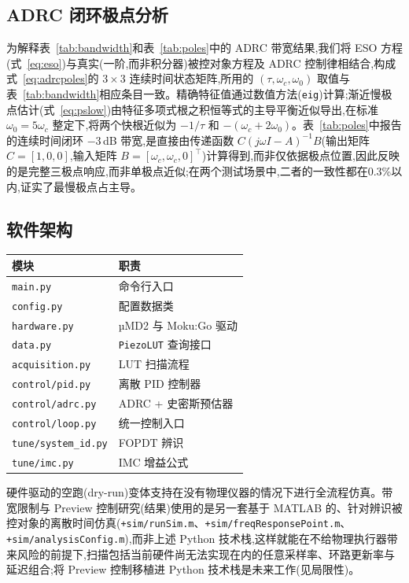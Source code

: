 \documentclass[fleqn,10pt]{wlscirep}
\begin{document}
\subsection*{ADRC 闭环极点分析}

为解释表~\ref{tab:bandwidth}和表~\ref{tab:poles}中的 ADRC 带宽结果,我们将 ESO 方程(式~\ref{eq:eso})与真实(一阶,而非积分器)被控对象方程及 ADRC 控制律相结合,构成式~\ref{eq:adrcpoles}的 $3\times3$ 连续时间状态矩阵,所用的 $(\tau,\omega_c,\omega_0)$ 取值与表~\ref{tab:bandwidth}相应条目一致。精确特征值通过数值方法(\texttt{eig})计算;渐近慢极点估计(式~\ref{eq:pslow})由特征多项式根之积恒等式的主导平衡近似导出,在标准 $\omega_0=5\omega_c$ 整定下,将两个快根近似为 $-1/\tau$ 和 $-(\omega_c+2\omega_0)$。表~\ref{tab:poles}中报告的连续时间闭环 $-3$\,dB 带宽,是直接由传递函数 $C(j\omega I - A)^{-1}B$(输出矩阵 $C=[1,0,0]$,输入矩阵 $B=[\omega_c,\omega_c,0]^\top$)计算得到,而非仅依据极点位置,因此反映的是完整三极点响应,而非单极点近似;在两个测试场景中,二者的一致性都在0.3\%以内,证实了最慢极点占主导。

\subsection*{软件架构}

\begin{center}
\small
\begin{tabular}{ll}
\toprule
模块 & 职责 \\
\midrule
\texttt{main.py}         & 命令行入口 \\
\texttt{config.py}       & 配置数据类 \\
\texttt{hardware.py}     & µMD2 与 Moku:Go 驱动 \\
\texttt{data.py}         & \texttt{PiezoLUT} 查询接口 \\
\texttt{acquisition.py}  & LUT 扫描流程 \\
\texttt{control/pid.py}  & 离散 PID 控制器 \\
\texttt{control/adrc.py} & ADRC + 史密斯预估器 \\
\texttt{control/loop.py} & 统一控制入口 \\
\texttt{tune/system\_id.py} & FOPDT 辨识 \\
\texttt{tune/imc.py}     & IMC 增益公式 \\
\bottomrule
\end{tabular}
\end{center}

硬件驱动的空跑(dry-run)变体支持在没有物理仪器的情况下进行全流程仿真。带宽限制与 Preview 控制研究(结果)使用的是另一套基于 MATLAB 的、针对辨识被控对象的离散时间仿真(\texttt{+sim/runSim.m}、\texttt{+sim/freqResponsePoint.m}、\texttt{+sim/analysisConfig.m}),而非上述 Python 技术栈,这样就能在不给物理执行器带来风险的前提下,扫描包括当前硬件尚无法实现在内的任意采样率、环路更新率与延迟组合;将 Preview 控制移植进 Python 技术栈是未来工作(见局限性)。
\end{document}
